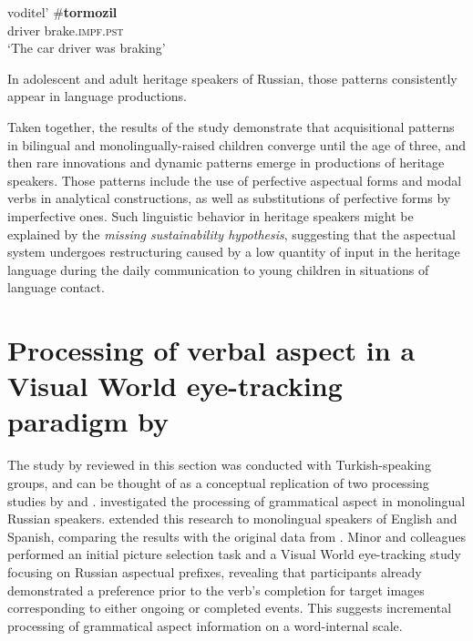 \documentclass[output=paper,colorlinks,citecolor=brown]{langscibook}
\begin{document}
 \ea \label{RUinnovations2}
 \gll voditel’ \#\textbf{tormozil} \\
 driver \hphantom{\#}brake.\textsc{impf.pst}\\
 \glt `The car driver was braking'
 \z

In adolescent and adult heritage speakers of Russian, those patterns consistently appear in language productions. 

Taken together, the results of the study demonstrate that acquisitional patterns in bilingual and monolingually-raised children converge until the age of three, and then rare innovations and dynamic patterns emerge in productions of heritage speakers. Those patterns include the use of perfective aspectual forms and modal verbs in analytical constructions, as well as substitutions of perfective forms by imperfective ones. Such linguistic behavior in heritage speakers might be explained by the \textit{missing sustainability hypothesis}, suggesting that the aspectual system undergoes restructuring caused by a low quantity of input in the heritage language during the daily communication to young children in situations of language contact.

\section{Processing of verbal aspect in a Visual World eye-tracking paradigm by \textcite{Ozsoy_2023}} \label{eye-tracking_in_Turkish}

The study by \textcite{Ozsoy_2023} reviewed in this section was conducted with Turkish-speaking groups, and can be thought of as a conceptual replication of two processing studies by \textcite{minor2022fine} and \textcite{minor2023aspect}. \textcite{minor2022fine} investigated the processing of grammatical aspect in monolingual Russian speakers. \textcite{minor2023aspect} extended this research to monolingual speakers of English and Spanish, comparing the results with the original data from \textcite{minor2022fine}. Minor and colleagues performed an initial picture selection task and a Visual World eye-tracking study focusing on Russian aspectual prefixes, revealing that participants already demonstrated a preference prior to the verb's completion for target images corresponding to either ongoing or completed events. This suggests incremental processing of grammatical aspect information on a word-internal scale. 
\end{document}
